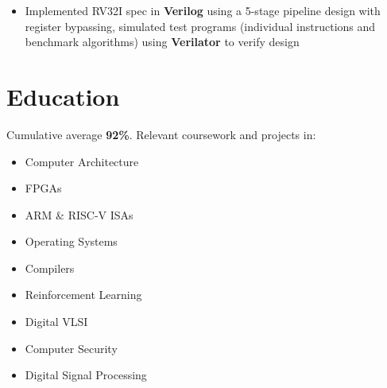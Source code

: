 \documentclass{moderncv}
\begin{document}
{\begin{itemize}
    \item Implemented RV32I spec in \textbf{Verilog} using a 5-stage pipeline design with register bypassing, simulated test programs (individual instructions and benchmark algorithms) using \textbf{Verilator} to verify design
\end{itemize}}


\section{Education}
{
    Cumulative average \textbf{92\%}. Relevant coursework and projects in:\\
\begin{minipage}{0.3\textwidth}
\begin{itemize}
    \item Computer Architecture
    \item FPGAs
    \item ARM \& RISC-V ISAs
\end{itemize}
\end{minipage}
\begin{minipage}{0.3\textwidth}
\begin{itemize}
    \item Operating Systems
    \item Compilers
    \item Reinforcement Learning
\end{itemize}
\end{minipage}
\begin{minipage}{0.3\textwidth}
\begin{itemize}
    \item Digital VLSI
    \item Computer Security
    \item Digital Signal Processing
\end{itemize}
\end{minipage}
}
\end{document}
